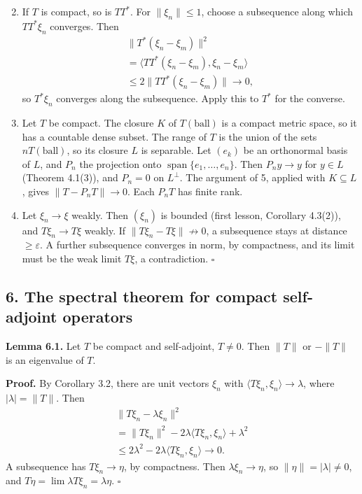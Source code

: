 \documentclass[
  english,
  11pt,
  a4paper,
]{article}
\begin{document}
\begin{enumerate}
\setcounter{enumi}{1}
\item
  If \(T\) is compact, so is \(TT^*\). For \(\|\xi_n\|\le1\), choose a
  subsequence along which \(TT^*\xi_n\) converges. Then
  \[\begin{gathered}
  \|T^*(\xi_n-\xi_m)\|^2\\
  =\langle TT^*(\xi_n-\xi_m),\xi_n-\xi_m\rangle\\
  \le2\|TT^*(\xi_n-\xi_m)\|\to0,
  \end{gathered}\] so \(T^*\xi_n\) converges along the subsequence.
  Apply this to \(T^*\) for the converse.
\item
  Let \(T\) be compact. The closure \(K\) of \(T(\text{ball})\) is a
  compact metric space, so it has a countable dense subset. The range of
  \(T\) is the union of the sets \(nT(\text{ball})\), so its closure
  \(L\) is separable. Let \((e_k)\) be an orthonormal basis of \(L\),
  and \(P_n\) the projection onto
  \(\operatorname{span}\{e_1,\dots,e_n\}\). Then \(P_ny\to y\) for
  \(y\in L\) (Theorem 4.1(3)), and \(P_n=0\) on \(L^\perp\). The
  argument of 5, applied with \(K\subseteq L\), gives
  \(\|T-P_nT\|\to0\). Each \(P_nT\) has finite rank.
\item
  Let \(\xi_n\to\xi\) weakly. Then \((\xi_n)\) is bounded (first lesson,
  Corollary 4.3(2)), and \(T\xi_n\to T\xi\) weakly. If
  \(\|T\xi_n-T\xi\|\not\to0\), a subsequence stays at distance
  \(\ge\varepsilon\). A further subsequence converges in norm, by
  compactness, and its limit must be the weak limit \(T\xi\), a
  contradiction. \(\square\)
\end{enumerate}

\subsection[6. The spectral theorem for compact self-adjoint
operators]{\texorpdfstring{\protect\hypertarget{hilbert-spaces-and-compact-operators--oa-fnd-hs-06}{}{}6.
The spectral theorem for compact self-adjoint
operators}{6. The spectral theorem for compact self-adjoint operators}}\label{hilbert-spaces-and-compact-operators--OA-FND-HS-06}

\textbf{Lemma 6.1.} Let \(T\) be compact and self-adjoint, \(T\ne0\).
Then \(\|T\|\) or \(-\|T\|\) is an eigenvalue of \(T\).

\textbf{Proof.} By Corollary 3.2, there are unit vectors \(\xi_n\) with
\(\langle T\xi_n,\xi_n\rangle\to\lambda\), where \(|\lambda|=\|T\|\).
Then \[\begin{gathered}
\|T\xi_n-\lambda\xi_n\|^2\\
=\|T\xi_n\|^2-2\lambda\langle T\xi_n,\xi_n\rangle+\lambda^2\\
\le2\lambda^2-2\lambda\langle T\xi_n,\xi_n\rangle\to0.
\end{gathered}\] A subsequence has \(T\xi_n\to\eta\), by compactness.
Then \(\lambda\xi_n\to\eta\), so \(\|\eta\|=|\lambda|\ne0\), and
\(T\eta=\lim\lambda T\xi_n=\lambda\eta\). \(\square\)
\end{document}
